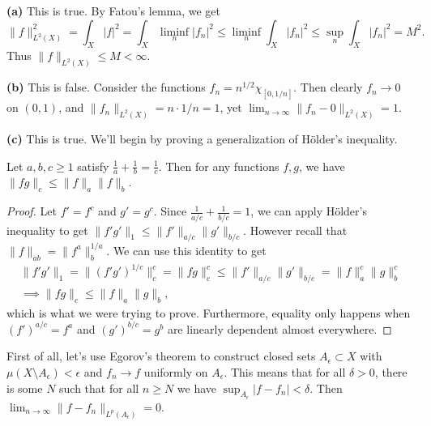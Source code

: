 \documentclass[11pt,letterpaper]{article}
\begin{document}
\begin{solution}
    \textbf{(a)} This is true. By Fatou's lemma, we get
    \[
       \|f\|_{L^2(X)}^2= \int_X |f|^2 =  \int_X \liminf_n|f_n|^2 \leq \liminf_n \int_X |f_n|^2 \leq \sup_n \int_X |f_n|^2 = M^2
    .\] 
    Thus $\|f\|_{L^2(X)} \leq M < \infty$. 

    \textbf{(b)} This is false. Consider the functions $f_n = n^{1 /2}\chi_{[0,1 /n]}$. Then clearly $f_n \to 0$ on $(0,1)$, and $\|f_n\|_{L^2(X)} = n\cdot 1 / n =1$, yet $\lim_{n\to\infty} \|f_n - 0\|_{L^2(X)}=1$.

    \textbf{(c)} This is true. We'll begin by proving a generalization of H\"older's inequality.
    \begin{claim}
        Let $a,b,c\geq 1$ satisfy $\frac{1}{a}+\frac{1}{b}=\frac{1}{c}$. Then for any functions $f,g$, we have $\|fg\|_c \leq \|f\|_a\|f\|_b$.  
    \end{claim}
    \begin{proof}
        Let $f' = f^c$ and $g'=g^c$. Since $\frac{1}{a /c} + \frac{1}{b /c} = 1$, we can apply H\"older's inequality to get $\|f'g'\|_1 \leq \|f'\|_{a /c}\|g'\|_{b /c}.$ However recall that $\|f\|_{ab} = \|f^a\|^{1 /a}_b$. We can use this identity to get
        \[
            \begin{aligned}
                \|f'g'\|_1=\|(f'g')^{1 /c}\|_{c}^c = \|fg\|^c_c \leq \|f'\|_{a /c}\|g'\|_{b /c} = \|f\|_{a}^c\|g\|_b^c\\
                \implies \|fg\|_c \leq \|f\|_a\|g\|_b,
            \end{aligned}
        \]
        which is what we were trying to prove. Furthermore, equality only happens when $(f')^{a /c}=f^a$ and $(g')^{b /c}=g^b$ are linearly dependent almost everywhere.
    \end{proof}

    \quad First of all, let's use Egorov's theorem to construct closed sets $A_\epsilon \subset X$ with $\mu(X\setminus A_\epsilon)< \epsilon$ and $f_n \to f$ uniformly on $A_\epsilon$. This means that for all $\delta>0$, there is some $N$ such that for all $n\geq N$ we have $\sup_{A_\epsilon} |f-f_n| < \delta$. Then $\lim_{n\to \infty}\|f-f_n\|_{L^p(A_\epsilon)}=0$.
    

\end{solution}
\end{document}
